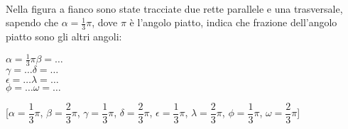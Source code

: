 % 

\begin{esercizio}
\label{ese:}
~

\noindent\begin{minipage}{.33\textwidth}
Nella figura a fianco sono state tracciate due rette parallele e una 
trasversale, sapendo che \(\alpha=\frac{1}{3}\pi\), dove \(\pi\) è 
l'angolo piatto, indica che frazione dell'angolo piatto sono gli 
altri angoli:
\end{minipage} \hfill
\begin{minipage}{.3\textwidth}
\(\alpha=\frac{1}{3}\pi\)\tab\tab \(\beta = \ldots\)\\
\(\gamma=\ldots\)\tab\tab \(\delta = \ldots\)\\
\(\epsilon=\ldots\)\tab\tab \(\lambda = \ldots\)\\
\(\phi=\ldots\)\tab\tab \(\omega = \ldots\)
\end{minipage} \hfill
\begin{minipage}{.3\textwidth}
\begin{inaccessibleblock}
\begin{center}  \end{center}
\end{inaccessibleblock}
\end{minipage}
\tab\hfill [\(\alpha=\dfrac{1}{3}\pi\), \(\beta=\dfrac{2}{3}\pi\), 
\(\gamma=\dfrac{1}{3}\pi\), \(\delta=\dfrac{2}{3}\pi\), 
\(\epsilon=\dfrac{1}{3}\pi\), \(\lambda=\dfrac{2}{3}\pi\), 
\(\phi=\dfrac{1}{3}\pi\), \(\omega=\dfrac{2}{3}\pi\)]
\end{esercizio}

